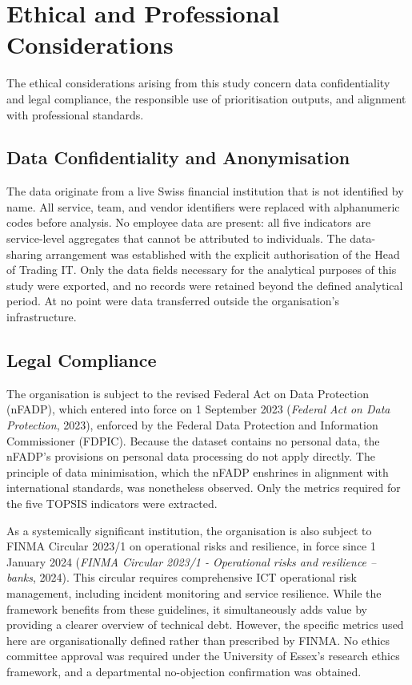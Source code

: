 \documentclass[
  12pt,
  letterpaper,
  12pt,
  oneside,
  english,
  onehalfspacing,
  headsepline]{MastersDoctoralThesis}
\begin{document}
\section{Ethical and Professional Considerations}\label{sec-ethics}

The ethical considerations arising from this study concern data
confidentiality and legal compliance, the responsible use of
prioritisation outputs, and alignment with professional standards.

\subsection{Data Confidentiality and
Anonymisation}\label{data-confidentiality-and-anonymisation}

The data originate from a live Swiss financial institution that is not
identified by name. All service, team, and vendor identifiers were
replaced with alphanumeric codes before analysis. No employee data are
present: all five indicators are service-level aggregates that cannot be
attributed to individuals. The data-sharing arrangement was established
with the explicit authorisation of the Head of Trading IT. Only the data
fields necessary for the analytical purposes of this study were
exported, and no records were retained beyond the defined analytical
period. At no point were data transferred outside the organisation's
infrastructure.

\subsection{Legal Compliance}\label{legal-compliance}

The organisation is subject to the revised Federal Act on Data
Protection (nFADP), which entered into force on 1 September 2023
(\emph{Federal {Act} on {Data Protection}}, 2023), enforced by the
Federal Data Protection and Information Commissioner (FDPIC). Because
the dataset contains no personal data, the nFADP's provisions on
personal data processing do not apply directly. The principle of data
minimisation, which the nFADP enshrines in alignment with international
standards, was nonetheless observed. Only the metrics required for the
five TOPSIS indicators were extracted.

As a systemically significant institution, the organisation is also
subject to FINMA Circular 2023/1 on operational risks and resilience, in
force since 1 January 2024 (\emph{{FINMA Circular} 2023/1 -
{Operational} risks and resilience -- banks}, 2024). This circular
requires comprehensive ICT operational risk management, including
incident monitoring and service resilience. While the framework benefits
from these guidelines, it simultaneously adds value by providing a
clearer overview of technical debt. However, the specific metrics used
here are organisationally defined rather than prescribed by FINMA. No
ethics committee approval was required under the University of Essex's
research ethics framework, and a departmental no-objection confirmation
was obtained.
\end{document}
